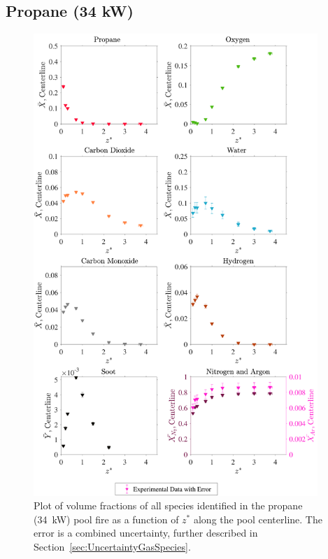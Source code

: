 \documentclass[12pt]{article}
\begin{document}
\subsection{Propane (34 kW)}
\label{ssec:Propane34kW_ALL_Vol_Frac}
\begin{figure}[!h]
	\centering
\includegraphics[width=10.75cm,keepaspectratio]{Propane 34KW_MOL_FRAC_Plot.pdf}
	\caption[Volume fractions of major species in the propane (34~kW) plume]{Plot of volume fractions of all species identified in the propane (34~kW) pool fire as a function of $z^{*}$ along the pool centerline. The error is a combined uncertainty, further described in Section~\ref{sec:UncertaintyGasSpecies}.}
	\label{fig:Propane20kW_VOL_Frac_Major}
\end{figure}
\end{document}
